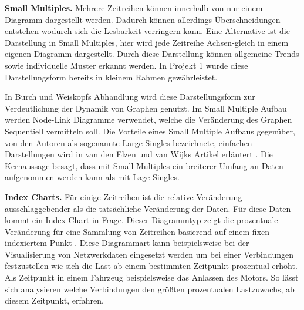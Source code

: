 \documentclass[draft=false
              ,paper=a4
              ,twoside=false
              ,fontsize=11pt
              ,headsepline
              ,BCOR10mm
              ,DIV11
              ]{scrbook}
\begin{document}
\textbf{Small Multiples.} Mehrere Zeitreihen können innerhalb von nur einem Diagramm dargestellt werden. Dadurch können allerdings Überschneidungen entstehen wodurch sich die Lesbarkeit verringern kann. Eine Alternative ist die Darstellung in Small Multiples, hier wird jede Zeitreihe Achsen-gleich in einem eigenen Diagramm dargestellt. Durch diese Darstellung können allgemeine Trends sowie individuelle Muster erkannt werden. In Projekt 1 wurde diese Darstellungsform bereits in kleinem Rahmen gewährleistet. 

In Burch und Weiskopfs Abhandlung \cite{Burch:2014:FES:2636240.2636839} wird diese Darstellungsform zur Verdeutlichung der Dynamik von Graphen genutzt. Im Small Multiple Aufbau werden Node-Link Diagramme verwendet, welche die Veränderung des Graphen Sequentiell vermitteln soll. Die Vorteile eines Small Multiple Aufbaus gegenüber, von den Autoren als sogenannte Large Singles bezeichnete, einfachen Darstellungen wird in van den Elzen und van Wijks Artikel erläutert \cite{elzen_small_multiple_2013}. Die Kernaussage besagt, dass mit Small Multiples ein breiterer Umfang an Daten aufgenommen werden kann als mit Lage Singles.

\textbf{Index Charts.} Für einige Zeitreihen ist die relative Veränderung ausschlaggebender als die tatsächliche Veränderung der Daten. Für diese Daten kommt ein Index Chart in Frage. Dieser Diagrammtyp zeigt die prozentuale Veränderung für eine Sammlung von Zeitreihen basierend auf einem fixen indexiertem Punkt \cite{heer_tour_2010}. Diese Diagrammart kann beispielsweise bei der Visualisierung von Netzwerkdaten eingesetzt werden um bei einer Verbindungen festzustellen wie sich die Last ab einem bestimmten Zeitpunkt prozentual erhöht. Als Zeitpunkt in einem Fahrzeug beispielsweise das Anlassen des Motors. So lässt sich analysieren welche Verbindungen den größten prozentualen Lastzuwachs, ab diesem Zeitpunkt, erfahren.
\end{document}
